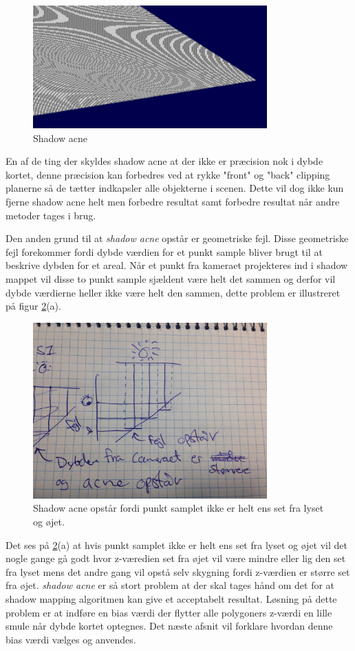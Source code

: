 \documentclass[11pt,a4paper]{article}
\begin{document}
\begin{figure}[ht!]
\centering
\includegraphics[width=90mm]{img/S0.png}
\caption{Shadow acne}
\label{S0}
\end{figure}

En af de ting der skyldes shadow acne at der ikke er præcision nok i dybde kortet, denne præcision kan forbedres ved at rykke  "front"  og "back" clipping planerne så de tætter indkapsler alle objekterne i scenen. Dette vil dog ikke kun fjerne shadow acne helt men forbedre resultat samt forbedre resultat når andre metoder tages i brug. 


Den anden grund til at \textit{shadow acne} opstår er geometriske fejl. Disse geometriske fejl forekommer fordi dybde værdien for et punkt sample bliver brugt til at beskrive dybden for et areal. Når et punkt fra kameraet projekteres ind i shadow mappet vil disse to punkt sample sjældent være helt det sammen og derfor vil dybde værdierne heller ikke være helt den sammen, dette problem er illustreret på figur \ref{S1}(a).

\begin{figure}[ht!]
\centering
\includegraphics[width=90mm]{img/S1.jpg}
\caption{Shadow acne opstår fordi punkt samplet ikke er helt ens set fra lyset og øjet.}
\label{S1}
\end{figure}

Det ses på \ref{S1}(a) at hvis punkt samplet ikke er helt ens set fra lyset og øjet vil det nogle gange gå godt hvor z-væredien set fra øjet vil være mindre eller lig den set fra lyset mens det andre gang vil opstå selv skygning fordi z-værdien er større set fra øjet. \textit{shadow acne} er så stort problem at der skal tages hånd om det for at shadow mapping algoritmen kan give et acceptabelt resultat. Løsning på dette problem er at indføre en bias værdi der flytter alle polygoners z-værdi en lille smule når dybde kortet optegnes. Det næste afsnit vil forklare hvordan denne bias værdi vælges og anvendes.
\end{document}

